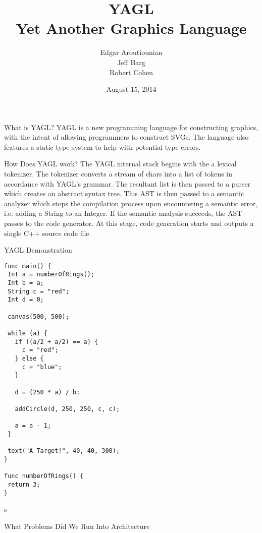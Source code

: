 \documentclass{beamer}
\title[YAGL]{YAGL\\Yet Another Graphics Language}
\author{Edgar Aroutiounian \\ Jeff Barg \\ Robert Cohen}
\institute{COMS S4115 - Programming Languages \& Translators \\ Columbia University}
\date{August 15, 2014}
\begin{document}
\begin{frame}
\titlepage
\end{frame}


\begin{frame}{What is YAGL?}
YAGL is a new programming language for constructing graphics, with the intent of allowing programmers to construct SVGs. The language also features a static type system to help with potential type errors. \\

\end{frame}

\begin{frame}{How Does YAGL work?}
The YAGL internal stack begins with the a lexical tokenizer. The tokenizer converts a stream of chars into a 
list of tokens in accordance with YAGL's grammar. The resultant list is then passed to a parser which creates an 
abstract syntax tree. This AST is then passed to a 
semantic analyzer which stops the compilation process
upon encountering a semantic error, i.e. adding a String to an Integer. If the semantic analysis succeeds, the AST 
passes to the code generator. At this stage, code generation starts and outputs a single C++ source code file.
\end{frame}

\begin{frame}{YAGL Demonstration}
\begin{lstlisting}
func main() { 
 Int a = numberOfRings();
 Int b = a;
 String c = "red";
 Int d = 0;

 canvas(500, 500);

 while (a) {
   if ((a/2 + a/2) == a) {
     c = "red";
   } else {
     c = "blue";
   }

   d = (250 * a) / b;

   addCircle(d, 250, 250, c, c);

   a = a - 1;
 }

 text("A Target!", 40, 40, 300);
}

func numberOfRings() {
 return 3;
}
\end{lstlisting}
s
\end{frame}

\begin{frame}{What Problems Did We Run Into}
Architecture
\end{frame}
\end{document}
